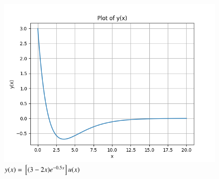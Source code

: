 \documentclass[journal,12pt,twocolumn]{IEEEtran}
\theoremstyle{remark}
\begin{document}
\begin{figure}[h]
    \centering
    \includegraphics[width=\columnwidth]{figs/fig1.png}
    \caption{$y(x) = {}\left[(3-2x)e^{-0.5x}\right]u(x)$}
    \label{fig:gate21ag26}
\end{figure}
\end{document}
